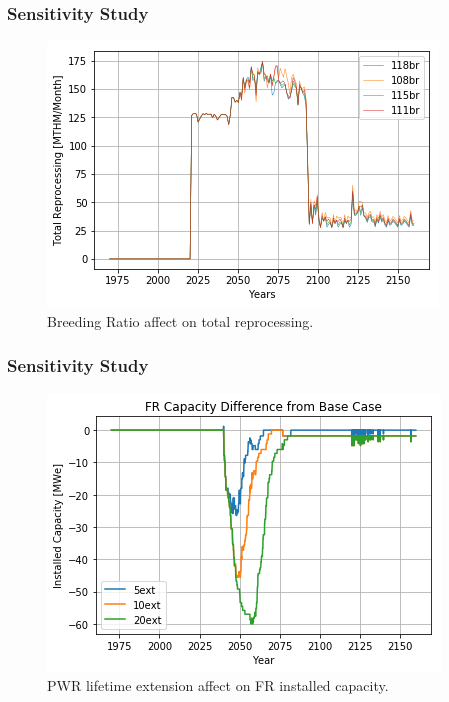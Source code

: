 \begin{frame}
    \frametitle{Sensitivity Study}
    \begin{figure}[htbp!]
        \begin{center}
                \includegraphics[width=.8\textwidth]{./images/sim_output/br_tot_rep.png}
        \end{center}
    \caption{Breeding Ratio affect on total reprocessing.}
    \end{figure}
\end{frame}

\begin{frame}
    \frametitle{Sensitivity Study}
    \begin{figure}[htbp!]
        \begin{center}
                \includegraphics[width=.8\textwidth]{./images/sim_output/fr_diff.png}
        \end{center}
    \caption{PWR lifetime extension affect on FR installed capacity.}
    \end{figure}
\end{frame}
